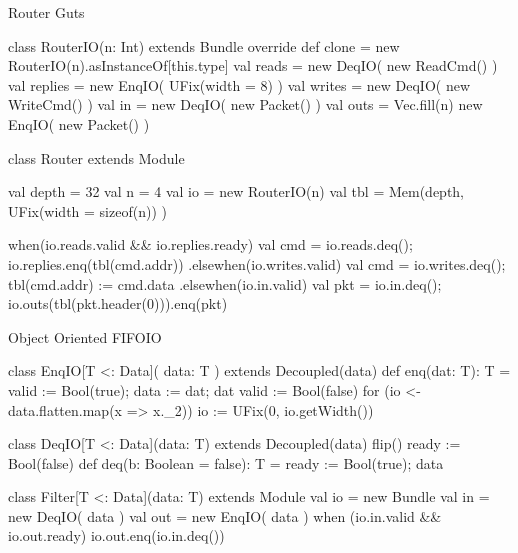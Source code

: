 \documentclass[xcolor=pdflatex,dvipsnames,table]{beamer}
\begin{document}
\begin{frame}[fragile]{Router Guts}

{
\begin{scala}
class RouterIO(n: Int) extends Bundle {
  override def clone = new RouterIO(n).asInstanceOf[this.type]
  val reads   = new DeqIO( new ReadCmd() )
  val replies = new EnqIO( UFix(width = 8) )
  val writes  = new DeqIO( new WriteCmd() )
  val in      = new DeqIO( new Packet() )
  val outs    = Vec.fill(n){ new EnqIO( new Packet() ) }
}

class Router extends Module {
  val depth = 32
  val n     = 4
  val io    = new RouterIO(n)
  val tbl   = Mem(depth, UFix(width = sizeof(n)) )
  
  when(io.reads.valid && io.replies.ready) { 
    val cmd = io.reads.deq();  io.replies.enq(tbl(cmd.addr))  
  } .elsewhen(io.writes.valid) { 
    val cmd = io.writes.deq(); tbl(cmd.addr) := cmd.data
  } .elsewhen(io.in.valid) {
    val pkt = io.in.deq(); io.outs(tbl(pkt.header(0))).enq(pkt) 
  } 
}
\end{scala}
}
\end{frame}

\begin{frame}[fragile]{Object Oriented FIFOIO}

{
\begin{scala}
class EnqIO[T <: Data]( data: T ) extends Decoupled(data) {
  def enq(dat: T): T = { valid := Bool(true); data := dat; dat }
  valid := Bool(false)
  for (io <- data.flatten.map(x => x._2))
    io := UFix(0, io.getWidth())
}

class DeqIO[T <: Data](data: T) extends Decoupled(data) {
  flip()
  ready := Bool(false)
  def deq(b: Boolean = false): T = { ready := Bool(true); data }
}

class Filter[T <: Data](data: T) extends Module {
  val io = new Bundle {
    val in  = new DeqIO( data )
    val out = new EnqIO( data )
  }
  when (io.in.valid && io.out.ready) {
    io.out.enq(io.in.deq())
  }
}
\end{scala}
}
\end{frame}
\end{document}
